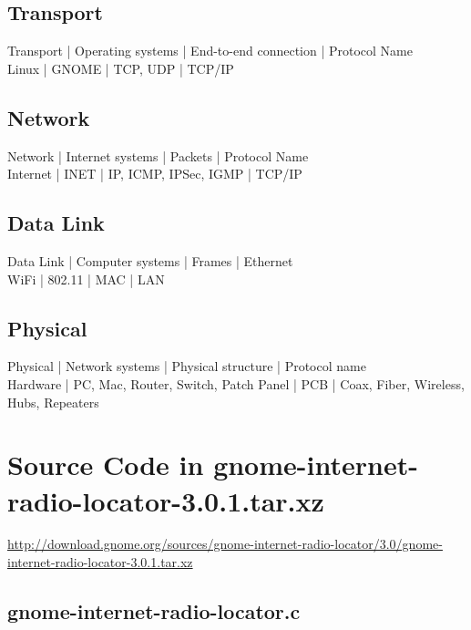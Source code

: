 \documentclass[a4paper,norsk,utf8]{report}
\begin{document}
\section{Transport}

    Transport | Operating systems | End-to-end connection | Protocol Name\\
    Linux | GNOME | TCP, UDP | TCP/IP\\

\section{Network}

    Network | Internet systems | Packets | Protocol Name\\
    Internet | INET | IP, ICMP, IPSec, IGMP | TCP/IP\\

\section{Data Link}

    Data Link | Computer systems | Frames | Ethernet\\
    WiFi | 802.11 | MAC | LAN\\

\section{Physical}

    Physical | Network systems | Physical structure | Protocol name\\
    Hardware | PC, Mac, Router, Switch, Patch Panel | PCB | Coax, Fiber, Wireless, Hubs, Repeaters\\

\chapter{Source Code in gnome-internet-radio-locator-3.0.1.tar.xz}

\url{http://download.gnome.org/sources/gnome-internet-radio-locator/3.0/gnome-internet-radio-locator-3.0.1.tar.xz}

\section{gnome-internet-radio-locator.c}


\end{document}
